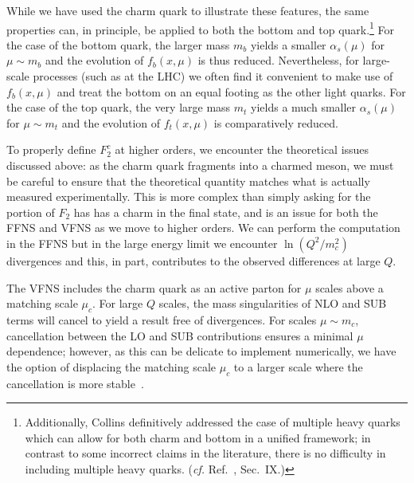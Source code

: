 %
While we have used the charm quark to illustrate these features, the
same properties can, in principle, be applied to both the bottom and
top quark.\footnote{Additionally, Collins definitively addressed the
  case of multiple heavy quarks which can allow for both charm and
  bottom in a unified framework; in contrast to some incorrect claims
  in the literature, there is no difficulty in including multiple
  heavy quarks. (\textit{cf.} Ref.~\cite{Collins:1998rz}, Sec.~IX.)}
For the case of the bottom quark, the larger mass $m_{b}$ yields a
smaller $\alpha_{s}(\mu)$ for $\mu\sim m_{b}$ and the evolution of
$f_{b}(x,\mu)$ is thus reduced. Nevertheless, for large-scale
processes (such as at the LHC) we often find it convenient to make use
of $f_{b}(x,\mu)$ and treat the bottom on an equal footing as the
other light quarks.
%
For the case of the top quark, the very large mass $m_{t}$ yields a
much smaller $\alpha_{s}(\mu)$ for $\mu\sim m_{t}$ and the evolution
of $f_{t}(x,\mu)$ is comparatively reduced.

%
To properly define $F_{2}^{c}$ at higher orders, we encounter the
theoretical issues discussed above: as the charm quark fragments into
a charmed meson, we must be careful to ensure that the theoretical
quantity matches what is actually measured experimentally.
%
This is more complex than simply asking for the portion of $F_{2}$
has has a charm in the final state, and is an issue for both the FFNS
and VFNS as we move to higher orders.
%
We can perform the computation in the FFNS but in the large energy
limit we encounter $\ln(Q^{2}/m_{c}^{2})$ divergences and this, in
part, contributes to the observed differences at large $Q$.

The VFNS includes the charm quark as an active parton for $\mu$ scales
above a matching scale $\mu_{c}$. For large $Q$ scales, the mass
singularities of NLO and SUB terms will cancel to yield a result free of
divergences. For scales $\mu\sim m_{c}$, cancellation between the LO
and SUB contributions ensures a minimal $\mu$ dependence; however, as
this can be delicate to implement numerically, we have the option of
displacing the matching scale $\mu_{c}$ to a larger scale where the
cancellation is more stable~\cite{Bertone:2017ehk,Bertone:2018ids}.

